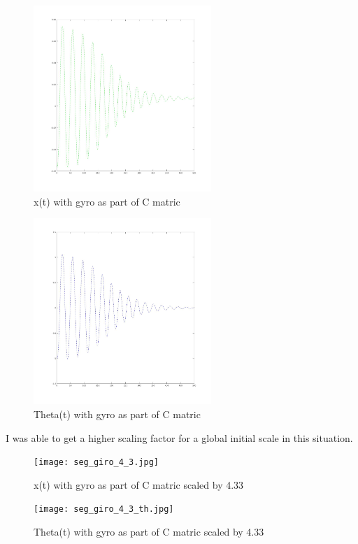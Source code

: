 \documentclass{article}
\begin{document}
\begin{figure}[H]
    \centering
    \includegraphics[width=0.6\textwidth]{x_pos_segway_obs_inital_only.jpg}
    \caption{x(t) with gyro as part of C matric}
    \label{fig:x_segway}
\end{figure}

\begin{figure}[H]
    \centering
    \includegraphics[width=0.6\textwidth]{th_pos_segway_obs_inital_only.jpg}
    \caption{Theta(t) with gyro as part of C matric}
    \label{fig:th_segway}
\end{figure}

I was able to get a higher scaling factor for a global initial scale in this situation.
\begin{figure}[H]
    \centering
    \texttt{[image: seg\_giro\_4\_3.jpg]}
    \caption{x(t) with gyro as part of C matric scaled by 4.33}
\end{figure}

\begin{figure}[H]
    \centering
    \texttt{[image: seg\_giro\_4\_3\_th.jpg]}
    \caption{Theta(t) with gyro as part of C matric scaled by 4.33}
    \label{fig:th_segway}
\end{figure}
\end{document}
